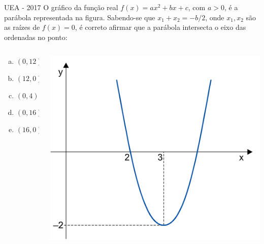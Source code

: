 \documentclass[11pt]{beamer}
\begin{document}
\begin{frame}{UEA - 2017}
    O gráfico da função real $f(x)=ax^{2}+ bx + c$, com $a > 0$, é a parábola representada na figura. Sabendo-se que $x_{1}+x_{2}= -{b}/2$, onde $ x_{1}, x_ {2}$ são as raízes de $f(x) = 0$, é correto afirmar que a parábola intersecta o eixo das ordenadas no ponto:

    \begin{columns}
        \begin{column}{0.4\textwidth}
            \begin{enumerate}[a)]
                \item $(0,12)$ 
                \item $(12,0)$
                \item $(0,4)$ 
                \item $(0,16)$ %
                \item $(16,0)$
            \end{enumerate}
        \end{column}

        \begin{column}{0.5\textwidth}
            \centering
            \includegraphics[width=0.8\linewidth]{imagens/uea-macro-2017(2).png}
        \end{column}
    \end{columns}
    
\end{frame}
\end{document}
